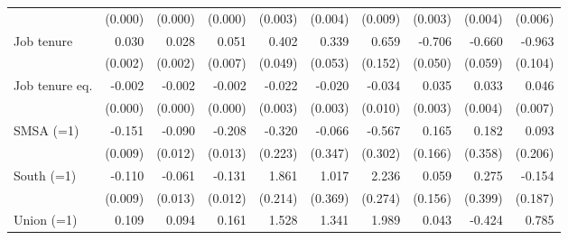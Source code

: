 {\begin{tabular}{l*{9}{D{.}{.}{-1}}}
                    &     (0.000)         &     (0.000)         &     (0.000)         &     (0.003)         &     (0.004)         &     (0.009)         &     (0.003)         &     (0.004)         &     (0.006)         \\
\addlinespace
Job tenure          &       0.030\sym{***}&       0.028\sym{***}&       0.051\sym{***}&       0.402\sym{***}&       0.339\sym{***}&       0.659\sym{***}&      -0.706\sym{***}&      -0.660\sym{***}&      -0.963\sym{***}\\
                    &     (0.002)         &     (0.002)         &     (0.007)         &     (0.049)         &     (0.053)         &     (0.152)         &     (0.050)         &     (0.059)         &     (0.104)         \\
\addlinespace
Job tenure eq.      &      -0.002\sym{***}&      -0.002\sym{***}&      -0.002\sym{***}&      -0.022\sym{***}&      -0.020\sym{***}&      -0.034\sym{***}&       0.035\sym{***}&       0.033\sym{***}&       0.046\sym{***}\\
                    &     (0.000)         &     (0.000)         &     (0.000)         &     (0.003)         &     (0.003)         &     (0.010)         &     (0.003)         &     (0.004)         &     (0.007)         \\
\addlinespace
SMSA (=1)           &      -0.151\sym{***}&      -0.090\sym{***}&      -0.208\sym{***}&      -0.320         &      -0.066         &      -0.567\sym{*}  &       0.165         &       0.182         &       0.093         \\
                    &     (0.009)         &     (0.012)         &     (0.013)         &     (0.223)         &     (0.347)         &     (0.302)         &     (0.166)         &     (0.358)         &     (0.206)         \\
\addlinespace
South (=1)          &      -0.110\sym{***}&      -0.061\sym{***}&      -0.131\sym{***}&       1.861\sym{***}&       1.017\sym{***}&       2.236\sym{***}&       0.059         &       0.275         &      -0.154         \\
                    &     (0.009)         &     (0.013)         &     (0.012)         &     (0.214)         &     (0.369)         &     (0.274)         &     (0.156)         &     (0.399)         &     (0.187)         \\
\addlinespace
Union (=1)          &       0.109\sym{***}&       0.094\sym{***}&       0.161\sym{***}&       1.528\sym{***}&       1.341\sym{***}&       1.989\sym{***}&       0.043         &      -0.424\sym{**} &       0.785\sym{***}\\

\end{tabular}}
